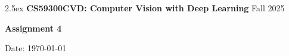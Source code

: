 \documentclass[oneside,11pt,letter]{article}
\newcommand{\myname}{}
\newcommand{\report}{}
\begin{document}

\thispagestyle{empty}
\begin{mdframed}
\baselineskip2.5ex
{\bf CS59300CVD: Computer Vision with Deep Learning}
\hfill
Fall 2025

{\Large
\begin{center}
{\bf \sf Assignment 4}
\end{center}
}

{\bf \myname}
\hfill
Date: \today
\end{mdframed}

\report{}

\end{document}
